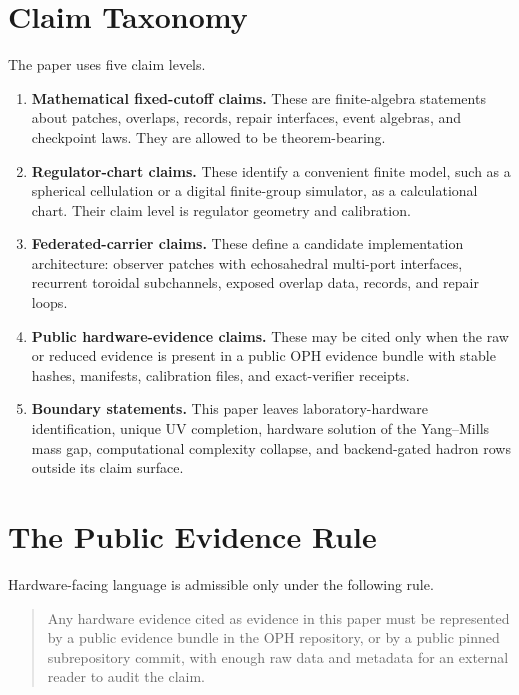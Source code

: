 \documentclass[11pt]{article}
\theoremstyle{remark}
\theoremstyle{plain}
\begin{document}
\section{Claim Taxonomy}

The paper uses five claim levels.

\begin{enumerate}[leftmargin=2em,label=\textbf{C\arabic*.}]
\item \textbf{Mathematical fixed-cutoff claims.} These are finite-algebra statements about
patches, overlaps, records, repair interfaces, event algebras, and checkpoint laws. They are
allowed to be theorem-bearing.

\item \textbf{Regulator-chart claims.} These identify a convenient finite model, such as a
spherical cellulation or a digital finite-group simulator, as a calculational chart. Their claim
level is regulator geometry and calibration.

\item \textbf{Federated-carrier claims.} These define a candidate implementation architecture:
observer patches with echosahedral multi-port interfaces, recurrent toroidal subchannels, exposed
overlap data, records, and repair loops.

\item \textbf{Public hardware-evidence claims.} These may be cited only when the raw or reduced
evidence is present in a public OPH evidence bundle with stable hashes, manifests, calibration
files, and exact-verifier receipts.

\item \textbf{Boundary statements.} This paper leaves laboratory-hardware identification, unique
UV completion, hardware solution of the Yang--Mills mass gap, computational complexity collapse,
and backend-gated hadron rows outside its claim surface.
\end{enumerate}

\section{The Public Evidence Rule}

Hardware-facing language is admissible only under the following rule.

\begin{quote}
Any hardware evidence cited as evidence in this paper must be represented by a public evidence
bundle in the OPH repository, or by a public pinned subrepository commit, with enough raw data and
metadata for an external reader to audit the claim.
\end{quote}
\end{document}
